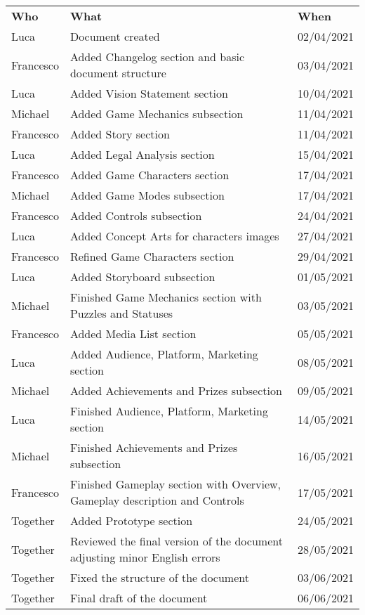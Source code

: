 \begin{longtable}{ m{2cm}m{8cm}m{3cm}} 
\centering 
 \textbf{Who}& \textbf{What} & \textbf{When}\\
Luca &			Document created			& 																	02/04/2021\\
Francesco & 	Added Changelog section and basic document structure	&										03/04/2021\\
Luca &			Added Vision Statement section &																10/04/2021\\
Michael	& 		Added Game Mechanics subsection &																11/04/2021\\
Francesco &		Added Story section  & 																			11/04/2021\\
Luca &			Added Legal Analysis section & 																	15/04/2021\\
Francesco &		Added Game Characters section & 																17/04/2021\\
Michael &		Added Game Modes subsection & 																	17/04/2021\\
Francesco &		Added Controls subsection & 																	24/04/2021\\
Luca &			Added Concept Arts for characters images &														27/04/2021\\
Francesco & 	Refined Game Characters section &																29/04/2021\\
Luca &			Added Storyboard subsection & 																	01/05/2021\\
Michael &		Finished Game Mechanics section with Puzzles and Statuses & 										03/05/2021\\
Francesco &		Added Media List section & 																		05/05/2021\\
Luca &			Added Audience, Platform, Marketing section & 													08/05/2021\\
Michael	&		Added Achievements and Prizes subsection &														09/05/2021\\
Luca & 			Finished Audience, Platform, Marketing section & 	14/05/2021\\
Michael &		Finished Achievements and Prizes subsection & 													16/05/2021\\
Francesco &		Finished Gameplay section with Overview, Gameplay description and Controls & 					17/05/2021\\
Together &		Added Prototype section & 																		24/05/2021\\
Together &		Reviewed the final version of the document adjusting minor English errors &  					28/05/2021\\
Together & 		Fixed the structure of the document  &  														03/06/2021\\
Together & 		Final draft of the document  &  														06/06/2021\\
\end{longtable}
\pagebreak
